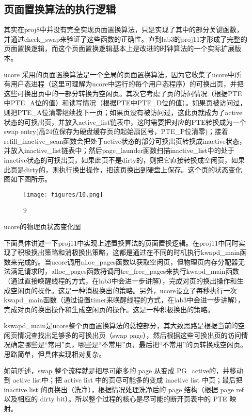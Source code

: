 \subsection{页面置换算法的执行逻辑}\label{ux9875ux9762ux7f6eux6362ux7b97ux6cd5ux7684ux6267ux884cux903bux8f91}

其实在proj8中并没有完全实现页面置换算法，只是实现了其中的部分关键函数，并通过check\_swap来验证了这些函数的正确性。直到lab3的proj11才形成了完整的页面置换逻辑，而这个页面置换逻辑基本上是改进的时钟算法的一个实际扩展版本。

ucore
采用的页面置换算法是一个全局的页面置换算法，因为它收集了ucore中所有用户态进程（这里可理解为ucore中运行的每个用户态程序）的可换出页，并把这些可换出页中的一部分转换为空闲页。其次它考虑了页的访问情况（根据PTE中PTE\_A位的值）和读写情况（根据PTE中PTE\_D位的值）。如果页被访问过，则把PTE\_A位清零继续找下一页；如果页没有被访问过，这此页就成为了active状态的可换出页，并放入active\_list链表中，这时需要把对应的PTE转换成为一个swap
entry(高24位保存为硬盘缓存页的起始扇区号，PTE\_P位清零)；接着refill\_inactive\_scan函数会把处于active状态的部分可换出页转换成inactive状态，并放入inactive\_list链表中；然后page\_launder函数扫描inactive\_list中的处于inactive状态的可换出页，如果此页不是dirty的，则把它直接转换成空闲页，如果此页是dirty的，则执行换出操作，把该页换出到硬盘上保存。这个页的状态变化图如下图所示。

\begin{figure}[htbp]
\centering
\texttt{[image: figures/10.png]}
\caption{9}
\end{figure}

ucore的物理页状态变化图

下面具体讲述一下proj11中实现上述置换算法的页面置换逻辑。在proj11中同时实现了积极换出策略和消极换出策略，这都是通过在不同的时机执行kwapd\_main函数来完成的。当ucore调用alloc\_pages函数以获取空闲页，但物理页内存分配器无法满足请求时，alloc\_pages函数将调用tre\_free\_pages来执行kwapd\_main函数（通过直接唤醒线程的方式，在lab3中会进一步讲解），完成对页的换出操作和生成空闲页的操作。这是一种消极换出的策略。另外，ucore设立了每秒执行一次kwapd\_main函数（通过设置timer来唤醒线程的方式，在lab3中会进一步讲解），完成对页的换出操作和生成空闲页的操作。这是一种积极换出的策略。

kswapd\_main是ucore整个页面置换算法的总控部分，其大致思路是根据当前的空闲页情况查找出足够多的可换出页（swap
page），然后根据这些可换出页的访问情况确定哪些是``常用''页，哪些是``不常用''页，最后把``不常用''的页转换成空闲页。思路简单，但具体实现相对复杂。

如前所述，swap 整个流程就是把尽可能多的 page 从变成
PG\_active的，并移动到 active list中；把 active list
中的页尽可能多的变成 inactive list 中页；最后把 inactive list
的页换出（洗净），根据情况处理洗净后的 page 结构（根据 page ref
以及相应的 dirty bit）。所以整个过程的核心是尽可能的断开页表中的 PTE
映射。


